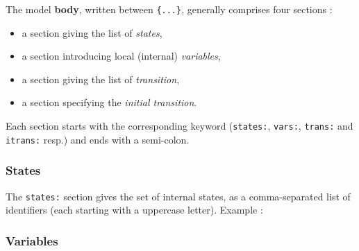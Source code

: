 \begin{center}
\end{center}

\begin{center}
\end{center}

\begin{center}
\end{center}

\medskip
The model \textbf{body}, written between \verb|{...}|, generally comprises four sections :
\begin{itemize}
\item a section giving the list of \emph{states},
\item a section introducing local (internal) \emph{variables},
\item a section giving the list of \emph{transition},
\item a section specifying the \emph{initial transition}.
\end{itemize}

Each section starts with the corresponding keyword (\verb|states:|, \verb|vars:|, \verb|trans:| and
\verb|itrans:| resp.) and ends with a semi-colon.

\begin{center}
\end{center}

\subsubsection*{States}
\label{sec:states}


The \verb|states:| section gives the set of internal states, as a comma-separated list of
identifiers (each starting with a uppercase letter). Example :

\begin{center}
\end{center}

\subsubsection*{Variables}
\label{sec:variables}


